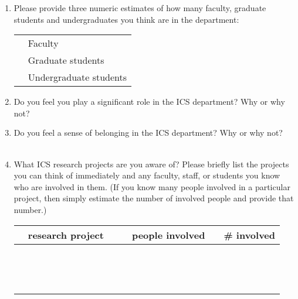 \begin{enumerate}
\item{Please provide three numeric estimates of how many faculty, graduate
  students and  undergraduates you think are in the department:}\\
  \begin{tabular}{ll}
    \underline{  }\underline{  }\underline{  }  & Faculty \\
    \underline{  }\underline{  }\underline{  }  & Graduate students \\
    \underline{  }\underline{  }\underline{  }  & Undergraduate students \\
  \end{tabular}

\item{Do you feel you play a significant role in the ICS department?  Why
  or why not?}
\\ 

\item{Do you feel a sense of belonging in the ICS department?  Why or why not?}
\\ \\

\item{What ICS research projects are you aware of?  Please briefly list the
  projects you can think of immediately and any faculty, staff, or students
  you know who are involved in them. (If you know many people involved in a
  particular project, then simply estimate the number of involved people
  and provide that number.)}\\
  \begin{tabular}{ccc|ccc|c}
    & research project & & &  people involved    & & \# involved    \\ \hline
    &&&&&&\\ &&&&&&\\ &&&&&&\\ &&&&&&\\ &&&&&&\\ &&&&&&\\ &&&&&&\\ &&&&&&\\
    &&&&&&\\ &&&&&&\\ &&&&&&\\ &&&&&&\\ &&&&&&\\ &&&&&&\\
  \end{tabular}


\end{enumerate}
